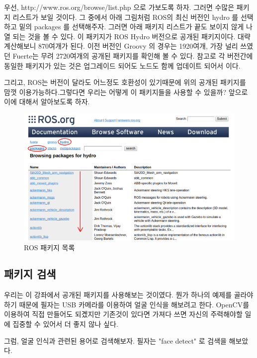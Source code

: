 우선, http://www.ros.org/browse/list.php 으로 가보도록 하자. 그러면 수많은 패키지 리스트가 보일 것이다. 그 중에서 아래 그림처럼 ROS의 최신 버전인 hydro 를 선택하고 밑의 packages 를 선택해주자. 그러면 아래 패키지 리스트가 끝도 보이지 않게 나열 되는 것을 볼 수 있다. 이 패키지가 ROS Hydro 버전으로 공개된 패키지이다. 대략 계산해보니  870여개가 된다. 이전 버전인 Groovy 의 경우는 1920여개, 가장 널리 쓰였던 Fuerte는 무려 2720여개의 공개된 패키지를 확인해 볼 수 있다. 참고로 각 버전간에 동일한 패키지가 있는 것은 업그레이드 되어도 노드도 함께 업데이트 되어서 이다.

그리고, ROS는 버전이 달라도 어느정도 호환성이 있기때문에 위의 공개된 패키지를 맘껏 이용가능하다.그렇다면 우리는 어떻게 이 패키지들을 사용할 수 있을까? 앞으로 이에 대해서 알아보도록 하자.

\begin{figure}[h]
\centering\includegraphics[width=0.9\columnwidth]{pictures/chapter8/openpkg1.png}
\caption{ROS 패키지 목록}
\end{figure}

\subsection{패키지 검색}

우리는 이 강좌에서 공개된 패키지를 사용해보는 것이였다. 뭔가 하나의 예제를 골라야하기 때문에 필자는 USB 카메라를 이용하여 얼굴 인식을 해보려고 한다. OpenCV를 이용하여 직접 만들어도 되곘지만 기존것이 있다면 가져다 쓰면 자신의 주력해야할 일에 집중할 수 있어서 더 좋지 않나 싶다.

그럼, 얼굴 인식과 관련된 용어로 검색해보자. 필자는 "face detect" 로 검색을 해보았다.

